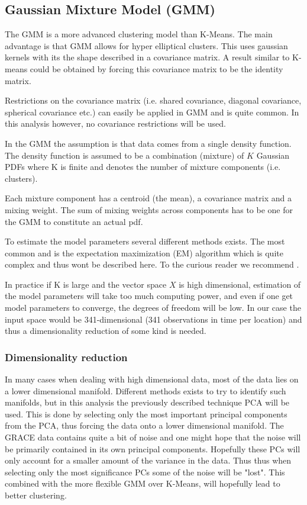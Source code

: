 \subsection{Gaussian Mixture Model (GMM)}
The GMM is a more advanced clustering model than K-Means. 
The main advantage is that GMM allows for hyper elliptical clusters. This uses gaussian kernels with its the shape described in a covariance matrix. A result similar to K-means could be obtained by forcing this covariance matrix to be the identity matrix.

Restrictions on the covariance matrix (i.e. shared covariance, diagonal covariance, spherical covariance etc.) can easily be applied in GMM and is quite common. In this analysis however, no covariance restrictions will be used.

In the GMM the assumption is that data comes from a single density function.
The density function is assumed to be a combination (mixture) of $K$ Gaussian PDFs where K is finite and denotes the number of mixture components (i.e. clusters).

Each mixture component has a centroid (the mean), a covariance matrix and a mixing weight.
The sum of mixing weights across components has to be one for the GMM to constitute an actual pdf.

To estimate the model parameters several different methods exists. The most common and is the expectation maximization (EM) algorithm which is quite complex and thus wont be described here. To the curious reader we recommend \cite[p.~214,272,463]{statistical-learning}.

In practice if K is large and the vector space $X$ is high dimensional, estimation of the model parameters will take too much computing power, and even if one get model parameters to converge, the degrees of freedom will be low.
In our case the input space would be 341-dimensional (341 observations in time per location) and thus a dimensionality reduction of some kind is needed. 

\subsubsection{Dimensionality reduction}
In many cases when dealing with high dimensional data, most of the data lies on a lower dimensional manifold. 
Different methods exists to try to identify such manifolds, but in this analysis the previously described technique PCA will be used. 
This is done by selecting only the most important principal components from the PCA, thus forcing the data onto a lower dimensional manifold.
The GRACE data contains quite a bit of noise and one might hope that the noise will be primarily contained in its own principal components. Hopefully these PCs will only account for a smaller amount of the variance in the data. 
Thus thus when selecting only the most significance PCs some of the noise will be "lost".
This combined with the more flexible GMM over K-Means, will hopefully lead to better clustering.
